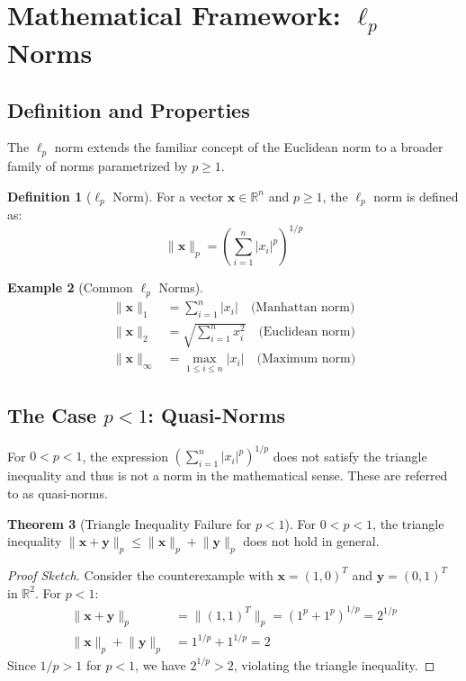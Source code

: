 \documentclass[12pt]{article}
\renewcommand{\vec}[1]{\mathbf{#1}}
\newcommand{\norm}[1]{\lVert#1\rVert}
\newcommand{\abs}[1]{\lvert#1\rvert}
\newcommand{\R}{\mathbb{R}}
\theoremstyle{definition}
\newtheorem{theorem}{Theorem}[section]
\newtheorem{definition}[theorem]{Definition}
\newtheorem{example}[theorem]{Example}
\begin{document}
\section{Mathematical Framework: $\ell_p$ Norms}

\subsection{Definition and Properties}

The $\ell_p$ norm extends the familiar concept of the Euclidean norm to a broader family of norms parametrized by $p \geq 1$.

\begin{definition}[$\ell_p$ Norm]
    For a vector $\vec{x} \in \R^n$ and $p \geq 1$, the $\ell_p$ norm is defined as:
    \begin{equation}
        \norm{\vec{x}}_p = \left(\sum_{i=1}^n \abs{x_i}^p\right)^{1/p}
    \end{equation}
\end{definition}

\begin{example}[Common $\ell_p$ Norms]
    \begin{align}
        \norm{\vec{x}}_1      & = \sum_{i=1}^n \abs{x_i} \quad \text{(Manhattan norm)}         \\
        \norm{\vec{x}}_2      & = \sqrt{\sum_{i=1}^n x_i^2} \quad \text{(Euclidean norm)}      \\
        \norm{\vec{x}}_\infty & = \max_{1 \leq i \leq n} \abs{x_i} \quad \text{(Maximum norm)}
    \end{align}
\end{example}

\subsection{The Case $p < 1$: Quasi-Norms}

For $0 < p < 1$, the expression $\left(\sum_{i=1}^n \abs{x_i}^p\right)^{1/p}$ does not satisfy the triangle inequality and thus is not a norm in the mathematical sense. These are referred to as quasi-norms.

\begin{theorem}[Triangle Inequality Failure for $p < 1$]
    For $0 < p < 1$, the triangle inequality $\norm{\vec{x} + \vec{y}}_p \leq \norm{\vec{x}}_p + \norm{\vec{y}}_p$ does not hold in general.
\end{theorem}

\begin{proof}[Proof Sketch]
    Consider the counterexample with $\vec{x} = (1, 0)^T$ and $\vec{y} = (0, 1)^T$ in $\R^2$. For $p < 1$:
    \begin{align}
        \norm{\vec{x} + \vec{y}}_p          & = \norm{(1, 1)^T}_p = (1^p + 1^p)^{1/p} = 2^{1/p} \\
        \norm{\vec{x}}_p + \norm{\vec{y}}_p & = 1^{1/p} + 1^{1/p} = 2
    \end{align}
    Since $1/p > 1$ for $p < 1$, we have $2^{1/p} > 2$, violating the triangle inequality.
\end{proof}
\end{document}
